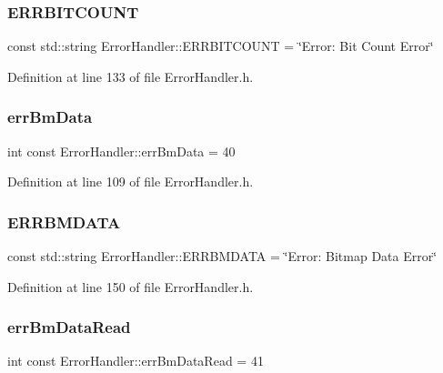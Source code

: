 \subsubsection{\texorpdfstring{ERRBITCOUNT}{ERRBITCOUNT}}
{\footnotesize\ttfamily const std\+::string Error\+Handler\+::\+E\+R\+R\+B\+I\+T\+C\+O\+U\+NT = \char`\"{}Error\+: Bit Count Error\char`\"{}\hspace{0.3cm}{\ttfamily [static]}}



Definition at line 133 of file Error\+Handler.\+h.

\mbox{\label{classErrorHandler_a0669b576bba1701445fc5e030cc23121}} 
\subsubsection{\texorpdfstring{errBmData}{errBmData}}
{\footnotesize\ttfamily int const Error\+Handler\+::err\+Bm\+Data = 40\hspace{0.3cm}{\ttfamily [static]}}



Definition at line 109 of file Error\+Handler.\+h.

\mbox{\label{classErrorHandler_a8aa9a03085699f122048543d17a74796}} 
\subsubsection{\texorpdfstring{ERRBMDATA}{ERRBMDATA}}
{\footnotesize\ttfamily const std\+::string Error\+Handler\+::\+E\+R\+R\+B\+M\+D\+A\+TA = \char`\"{}Error\+: Bitmap Data Error\char`\"{}\hspace{0.3cm}{\ttfamily [static]}}



Definition at line 150 of file Error\+Handler.\+h.

\mbox{\label{classErrorHandler_aa4d84bd14f132bc85fd7bccd9849b084}} 
\subsubsection{\texorpdfstring{errBmDataRead}{errBmDataRead}}
{\footnotesize\ttfamily int const Error\+Handler\+::err\+Bm\+Data\+Read = 41\hspace{0.3cm}{\ttfamily [static]}}



